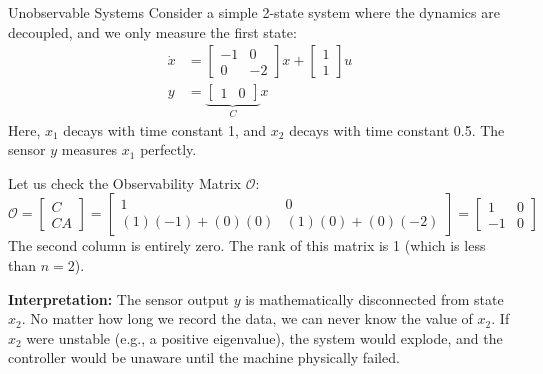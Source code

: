 \begin{examplebox}{Unobservable Systems}
Consider a simple 2-state system where the dynamics are decoupled, and we only measure the first state:
\begin{align*}
	\dot{x} &= \begin{bmatrix} -1 & 0 \\ 0 & -2 \end{bmatrix} x + \begin{bmatrix} 1 \\ 1 \end{bmatrix} u \\
	y &= \underbrace{\begin{bmatrix} 1 & 0 \end{bmatrix}}_{C} x
\end{align*}
Here, $x_1$ decays with time constant 1, and $x_2$ decays with time constant 0.5. The sensor $y$ measures $x_1$ perfectly.

Let us check the Observability Matrix $\mathcal{O}$:
\begin{equation*}
	\mathcal{O} = \begin{bmatrix} C \\ CA \end{bmatrix} 
	= \begin{bmatrix} 
		1 & 0 \\ 
		(1)(-1) + (0)(0) & (1)(0) + (0)(-2) 
	\end{bmatrix}
	= \begin{bmatrix} 
		1 & 0 \\ 
		-1 & 0 
	\end{bmatrix}
\end{equation*}
The second column is entirely zero. The rank of this matrix is 1 (which is less than $n=2$). 

\textbf{Interpretation:} The sensor output $y$ is mathematically disconnected from state $x_2$. No matter how long we record the data, we can never know the value of $x_2$. If $x_2$ were unstable (e.g., a positive eigenvalue), the system would explode, and the controller would be unaware until the machine physically failed.
\end{examplebox}

